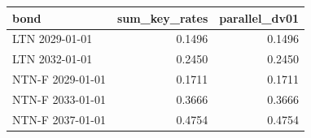 \begin{tabular}{lrr}
\toprule
bond & sum_key_rates & parallel_dv01 \\
\midrule
LTN 2029-01-01 & 0.1496 & 0.1496 \\
LTN 2032-01-01 & 0.2450 & 0.2450 \\
NTN-F 2029-01-01 & 0.1711 & 0.1711 \\
NTN-F 2033-01-01 & 0.3666 & 0.3666 \\
NTN-F 2037-01-01 & 0.4754 & 0.4754 \\
\bottomrule
\end{tabular}
